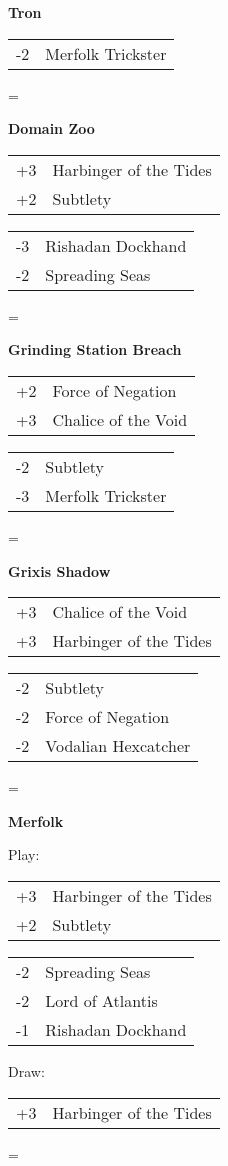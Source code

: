 \documentclass[fontsize=12pt,paper=a4]{scrartcl}
\newenvironment{absolutelynopagebreak}
  {\par\nobreak\vfil\penalty0\vfilneg
   \vtop\bgroup}
  {\par\xdef\tpd{\the\prevdepth}\egroup
   \prevdepth=\tpd}
\newenvironment{decklist}{%
    \begin{tabular}{>{\hspace{-4pt}}r<{\hspace{-3pt}}>{\hspace{-3pt}}l<{\hspace{-4pt}}}
    }{%
    \end{tabular}
    \par
}
\newcommand{\card}[2]{#1 & #2\\}
\newenvironment{sideboardguide}{%
    \newpage
    \begin{multicols}{4}
        \begin{small}
        }{%
        \end{small}
    \end{multicols}
}
\newenvironment{matchup}[1]{%
    \begin{absolutelynopagebreak}
        \textbf{#1}\par
    }{%
    \end{absolutelynopagebreak}
    \par\vspace{2em}
}
\begin{document}
\begin{sideboardguide}
\begin{matchup}{Tron}
\begin{decklist}
            \card{-2}{Merfolk Trickster}
        \end{decklist}
    \end{matchup}
    \begin{matchup}{Domain Zoo}
        \begin{decklist}
            \card{+3}{Harbinger of the Tides}
            \card{+2}{Subtlety}
        \end{decklist}
        \begin{decklist}
            \card{-3}{Rishadan Dockhand}
            \card{-2}{Spreading Seas}
        \end{decklist}
    \end{matchup}
    \begin{matchup}{Grinding Station Breach}
        \begin{decklist}
            \card{+2}{Force of Negation}
            \card{+3}{Chalice of the Void}
        \end{decklist}
        \begin{decklist}
            \card{-2}{Subtlety}
            \card{-3}{Merfolk Trickster}
        \end{decklist}
    \end{matchup}
    \begin{matchup}{Grixis Shadow}
        \begin{decklist}
            \card{+3}{Chalice of the Void}
            \card{+3}{Harbinger of the Tides}
        \end{decklist}
        \begin{decklist}
            \card{-2}{Subtlety}
            \card{-2}{Force of Negation}
            \card{-2}{Vodalian Hexcatcher}
        \end{decklist}
    \end{matchup}
    \begin{matchup}{Merfolk}
        Play:\par
        \begin{decklist}
            \card{+3}{Harbinger of the Tides}
            \card{+2}{Subtlety}
        \end{decklist}
        \begin{decklist}
            \card{-2}{Spreading Seas}
            \card{-2}{Lord of Atlantis}
            \card{-1}{Rishadan Dockhand}
        \end{decklist}
        Draw:\par
        \begin{decklist}
            \card{+3}{Harbinger of the Tides}

\end{decklist}
\end{matchup}
\end{sideboardguide}
\end{document}
